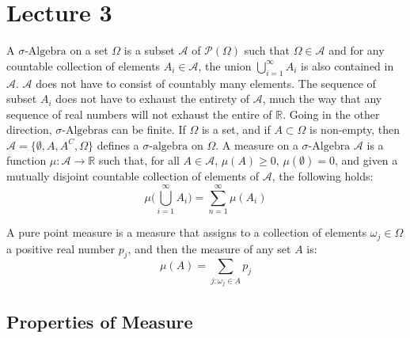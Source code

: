 \documentclass[crop=false,class=book,oneside]{standalone}
\begin{document}
    \section{Lecture 3}
        A $\sigma\text{-Algebra}$ on a set $\Omega$ is a subset
        $\mathcal{A}$ of $\mathcal{P}(\Omega)$ such that
        $\Omega\in\mathcal{A}$ and for any countable collection of
        elements $A_{i}\in\mathcal{A}$, the union
        $\bigcup_{i=1}^{\infty}A_{i}$ is also contained in
        $\mathcal{A}$. $\mathcal{A}$ does not have to consist of
        countably many elements. The sequence of subset $A_{i}$ does
        not have to exhaust the entirety of $\mathcal{A}$, much the
        way that any sequence of real numbers will not exhaust the
        entire of $\mathbb{R}$. Going in the other direction,
        $\sigma\text{-Algebras}$ can be finite. If $\Omega$ is a
        set, and if $A\subset\Omega$ is non-empty, then
        $\mathcal{A}=\{\emptyset,A,A^{C},\Omega\}$ defines a
        $\sigma\text{-algebra}$ on $\Omega$. A measure on a
        $\sigma\text{-Algebra}$ $\mathcal{A}$ is a function
        $\mu:\mathcal{A}\rightarrow\mathbb{R}$ such that, for all
        $A\in\mathcal{A}$, $\mu(A)\geq{0}$, $\mu(\emptyset)=0$, and
        given a mutually disjoint countable collection of elements of
        $\mathcal{A}$, the following holds:
        \begin{equation}
            \mu\Big(\bigcup_{i=1}^{\infty}A_{i}\Big)
            =\sum_{n=1}^{\infty}\mu(A_{i})
        \end{equation}
        \begin{example}
            A pure point measure is a measure that assigns to a
            collection of elements $\omega_{j}\in\Omega$ a positive
            real number $p_{j}$, and then the measure of any set
            $A$ is:
            \begin{equation}
                \mu(A)=\sum_{j:\omega_{j}\in{A}}p_{j}
            \end{equation}
        \end{example}
        \subsection{Properties of Measure}
\end{document}
